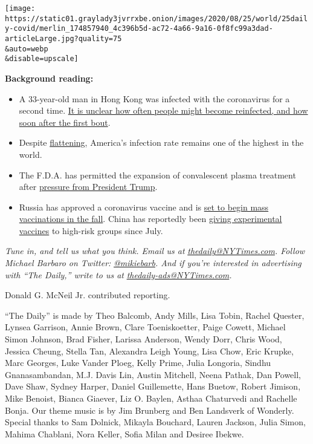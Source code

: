 \texttt{[image: https://static01.graylady3jvrrxbe.onion/images/2020/08/25/world/25daily-covid/merlin\_174857940\_4c396b5d-ac72-4a66-9a16-0f8fc99a3dad-articleLarge.jpg?quality=75\\\&auto=webp\\\&disable=upscale]}

\textbf{Background reading:}

\begin{itemize}
\item
  A 33-year-old man in Hong Kong was infected with the coronavirus for a
  second time.
  \href{https://www.nytimes3xbfgragh.onion/2020/08/24/health/coronavirus-reinfection.html?searchResultPosition=1}{It
  is unclear how often people might become reinfected, and how soon
  after the first bout}.
\item
  Despite
  \href{https://www.nytimes3xbfgragh.onion/interactive/2020/08/24/us/coronavirus-cases-decreasing.html?searchResultPosition=1}{flattening},
  America's infection rate remains one of the highest in the world.
\item
  The F.D.A. has permitted the expansion of convalescent plasma
  treatment after
  \href{https://www.nytimes3xbfgragh.onion/2020/08/23/us/politics/fda-plasma-coronavirus.html?searchResultPosition=4}{pressure
  from President Trump}.
\item
  Russia has approved a coronavirus vaccine and is
  \href{https://www.nytimes3xbfgragh.onion/2020/08/11/world/europe/russia-coronavirus-vaccine-approval.html?searchResultPosition=6}{set
  to begin mass vaccinations in the fall}. China has reportedly been
  \href{https://www.nytimes3xbfgragh.onion/reuters/2020/08/22/us/22reuters-health-coronavirus-vaccine-china-experimental.html?searchResultPosition=8}{giving
  experimental vaccines} to high-risk groups since July.
\end{itemize}

\emph{Tune in, and tell us what you think. Email us at}
\href{mailto:thedaily@NYTimes.com}{\emph{thedaily@NYTimes.com}}\emph{.
Follow Michael Barbaro on Twitter:}
\href{https://twitter.com/mikiebarb}{\emph{@mikiebarb}}\emph{. And if
you're interested in advertising with ``The Daily,'' write to us at}
\href{mailto:thedaily-ads@NYTimes.com}{\emph{thedaily-ads@NYTimes.com}}\emph{.}

Donald G. McNeil Jr. contributed reporting.

``The Daily'' is made by Theo Balcomb, Andy Mills, Lisa Tobin, Rachel
Quester, Lynsea Garrison, Annie Brown, Clare Toeniskoetter, Paige
Cowett, Michael Simon Johnson, Brad Fisher, Larissa Anderson, Wendy
Dorr, Chris Wood, Jessica Cheung, Stella Tan, Alexandra Leigh Young,
Lisa Chow, Eric Krupke, Marc Georges, Luke Vander Ploeg, Kelly Prime,
Julia Longoria, Sindhu Gnanasambandan, M.J. Davis Lin, Austin Mitchell,
Neena Pathak, Dan Powell, Dave Shaw, Sydney Harper, Daniel Guillemette,
Hans Buetow, Robert Jimison, Mike Benoist, Bianca Giaever, Liz O.
Baylen, Asthaa Chaturvedi and Rachelle Bonja. Our theme music is by Jim
Brunberg and Ben Landsverk of Wonderly. Special thanks to Sam Dolnick,
Mikayla Bouchard, Lauren Jackson, Julia Simon, Mahima Chablani, Nora
Keller, Sofia Milan and Desiree Ibekwe.

